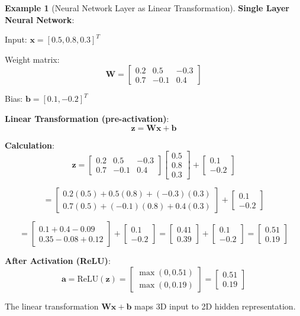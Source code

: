 \documentclass[12pt,a4paper]{article}
\theoremstyle{definition}
\newtheorem{example}{Example}[section]
\begin{document}
\begin{example}[Neural Network Layer as Linear Transformation]
\textbf{Single Layer Neural Network}:

Input: $\mathbf{x} = [0.5, 0.8, 0.3]^T$

Weight matrix:
\[
\mathbf{W} = \begin{bmatrix}
0.2 & 0.5 & -0.3 \\
0.7 & -0.1 & 0.4
\end{bmatrix}
\]

Bias: $\mathbf{b} = [0.1, -0.2]^T$

\textbf{Linear Transformation (pre-activation)}:
\[
\mathbf{z} = \mathbf{Wx} + \mathbf{b}
\]

\textbf{Calculation}:
\[
\mathbf{z} = \begin{bmatrix}
0.2 & 0.5 & -0.3 \\
0.7 & -0.1 & 0.4
\end{bmatrix}
\begin{bmatrix}
0.5 \\ 0.8 \\ 0.3
\end{bmatrix}
+ \begin{bmatrix}
0.1 \\ -0.2
\end{bmatrix}
\]

\[
= \begin{bmatrix}
0.2(0.5) + 0.5(0.8) + (-0.3)(0.3) \\
0.7(0.5) + (-0.1)(0.8) + 0.4(0.3)
\end{bmatrix}
+ \begin{bmatrix}
0.1 \\ -0.2
\end{bmatrix}
\]

\[
= \begin{bmatrix}
0.1 + 0.4 - 0.09 \\
0.35 - 0.08 + 0.12
\end{bmatrix}
+ \begin{bmatrix}
0.1 \\ -0.2
\end{bmatrix}
= \begin{bmatrix}
0.41 \\ 0.39
\end{bmatrix}
+ \begin{bmatrix}
0.1 \\ -0.2
\end{bmatrix}
= \begin{bmatrix}
0.51 \\ 0.19
\end{bmatrix}
\]

\textbf{After Activation (ReLU)}:
\[
\mathbf{a} = \text{ReLU}(\mathbf{z}) = \begin{bmatrix}
\max(0, 0.51) \\
\max(0, 0.19)
\end{bmatrix}
= \begin{bmatrix}
0.51 \\ 0.19
\end{bmatrix}
\]

The linear transformation $\mathbf{Wx} + \mathbf{b}$ maps 3D input to 2D hidden representation.
\end{example}
\end{document}
